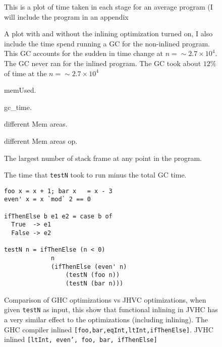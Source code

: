 \documentclass[a4paper]{article}
\begin{document}
\begin{figure}
  
  \caption{This is a plot of time taken in each stage for an average program (I will include
    the program in an appendix}
  \label{comp_bench}
\end{figure}

\begin{figure}
  
  \caption{A plot with and without the inlining optimization turned on, I also include 
    the time spend running a GC for the non-inlined program. This GC 
    accounts for the sudden in time change at $n = \sim 2.7 \times 10^4$.
    The GC never ran for the inlined program. The GC took about $12\%$ of time
     at the $n=\sim 2.7 \times 10^4$ }
   \label{nil_il_gc}
\end{figure}


\begin{figure}
  
  \caption{memUsed.}
\end{figure}

\begin{figure}
  
  \caption{gc\_time.}
\end{figure}

\begin{figure}
  
  \caption{different Mem areas.}
  \label{noinline_mem}
\end{figure}

\begin{figure}
  
  \caption{different Mem areas op.}
  \label{inline_mem}
\end{figure}

\begin{figure}
  
  \caption{The largest number of stack frame at any point in the program.}
  \label{stack_frame_op_n}
\end{figure}

\begin{figure}
  
  \caption{The time that \texttt{testN} took to run minus the total GC time.}
  \label{inlining_t_mgc}
\end{figure}

\begin{figure}
  
\begin{verbatim}
foo x = x + 1; bar x   = x - 3
even' x = x `mod` 2 == 0

ifThenElse b e1 e2 = case b of 
  True  -> e1
  False -> e2

testN n = ifThenElse (n < 0) 
             n 
             (ifThenElse (even' n) 
                 (testN (foo n)) 
                 (testN (bar n)))
\end{verbatim}
  \caption{Comparison of GHC optimizations vs JHVC optimizations, when given 
    \texttt{testN} as input, this show that functional inlining in 
  JVHC has a very similar effect to the optimizations (including inlining).
  The GHC compiler inlined
  \texttt{[foo,bar,eqInt,ltInt,ifThenElse]}.
  JVHC inlined \texttt{[ltInt, even', foo, bar, ifThenElse]}}
\end{figure}
\end{document}
